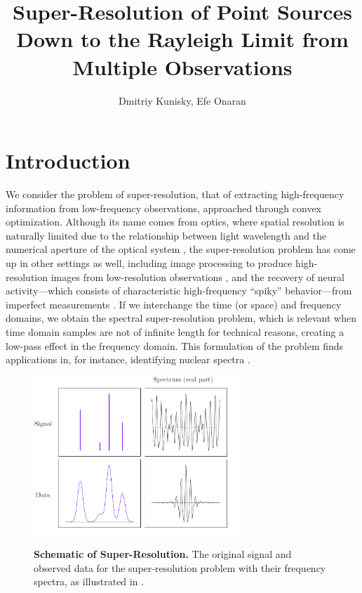 \documentclass[11pt]{article}
\title{Super-Resolution of Point Sources Down to the Rayleigh Limit from Multiple Observations}
\author{Dmitriy Kunisky, Efe Onaran}
\begin{document}
\maketitle

\noindent

\section{Introduction}

We consider the problem of super-resolution, that of extracting high-frequency information from low-frequency observations, approached through convex optimization. Although its name comes from optics, where spatial resolution is naturally limited due to the relationship between light wavelength and the numerical aperture of the optical system \cite{lindberg2012mathematical}, the super-resolution problem has come up in other settings as well, including image processing to produce high-resolution images from low-resolution observations \cite{farsiu2004advances}, and the recovery of neural activity---which consists of characteristic high-frequency ``spiky'' behavior---from imperfect measurements \cite{rieke1999spikes}. If we interchange the time (or space) and frequency domains, we obtain the spectral super-resolution problem, which is relevant when time domain samples are not of infinite length for technical reasons, creating a low-pass effect in the frequency domain. This formulation of the problem finds applications in, for instance, identifying nuclear spectra \cite{smith1969classification}.

\begin{figure}[h]
	\centering
	\includegraphics[width=0.7\textwidth]{../img/sig_data.png}
	\label{801}
	\caption{\textbf{Schematic of Super-Resolution.} The original signal and observed data for the super-resolution problem with their frequency spectra, as illustrated in \cite{fernandez2016super}.}
\end{figure}
\end{document}

